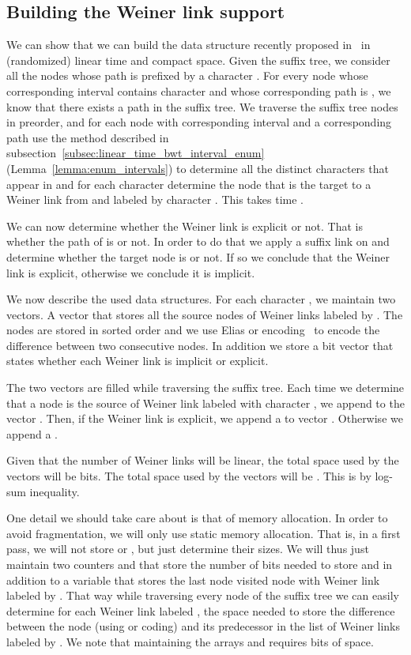 \documentclass[a4paper]{article}
\begin{document}
\begin{enumerate}
\subsection{Building the Weiner link support}
\label{sec:build_weiner_links}
We can show that we can build the data structure recently proposed in~\cite{BNtalg14} in 
(randomized) linear time and compact space. 
Given the suffix tree, we consider all the nodes whose path is prefixed by 
a character . For every node  whose corresponding  
interval contains character  and whose corresponding path is , we know that there 
exists a path  in the suffix tree. 
We traverse the suffix tree nodes in preorder, and for each node  with corresponding 
interval  and a corresponding path  use the method described 
in subsection~\ref{subsec:linear_time_bwt_interval_enum}  (Lemma~\ref{lemma:enum_intervals})
to determine all the  distinct characters 
that appear in  and for each character  
determine the node  that is the target to a Weiner link from  and labeled
by character . This takes time . 




We can now determine whether the Weiner link is explicit 
or not. That is whether the path of  is  or not. In order to do that 
we apply a suffix link on  and determine whether the target node is  
or not. If so we conclude that the Weiner link is explicit, otherwise we 
conclude it is implicit. 

We now describe the used data structures. For each character , we 
maintain two vectors. A vector  that stores all the source nodes 
of Weiner links labeled by . The nodes are stored in sorted order and 
we use Elias  or  encoding~\cite{El75} to encode the difference between two consecutive 
nodes. In addition we store a bit vector  that states whether each Weiner link 
is implicit or explicit. 

The two vectors  are filled while traversing the suffix tree. Each time 
we determine that a node  is the source of Weiner link labeled with character 
, we append  to the vector . Then, if the Weiner link is explicit, we 
append a  to vector . Otherwise we append a . 

Given that the number of Weiner links 
will be linear, the total space used by the vectors 
 will be  bits. The total space used by the vectors  will 
be . This is by log-sum inequality. 

One detail we should take care about is that of memory allocation. 
In order to avoid fragmentation, 
we will only use static memory allocation. That is, in a first pass, we will not 
store  or , but just determine their sizes. We will thus just maintain two 
counters  and  that store the number of bits needed to store 
 and  in addition to a variable  that stores the last node visited 
node with Weiner link labeled by . That way while traversing every node of the suffix tree
we can easily determine for each Weiner link labeled , the 
space needed to store the difference between the node (using  or  coding)
and its predecessor in the list of Weiner links labeled by . 
We note that maintaining the arrays  and  
requires  bits of space. 


\end{enumerate}
\end{document}

